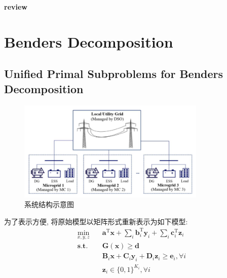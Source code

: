 \documentclass{article}
\begin{document}
\begin{center}
    \huge\bf review
\end{center}

\section{Benders Decomposition}
\subsection{Unified Primal Subproblems for Benders Decomposition}
\begin{figure}[htbp]
    \centering
    \includegraphics[width=0.8\textwidth]{./pic/NetworkedStructure.png}
    \caption{系统结构示意图}
    \label{fig:structure}
\end{figure}

为了表示方便, 将原始模型以矩阵形式重新表示为如下模型:
\begin{subequations}
    \begin{align}
        \min_{x, y, z}\quad &\mathbf{a}^\mathrm{T}\mathbf{x}+\sum_i\mathbf{b}_i^\mathrm{T}\mathbf{y}_i+\sum_i\mathbf{c}_i^\mathrm{T}\mathbf{z}_i \label{primal_a}\\
        \mathbf{s.t.}\quad & \mathbf{G}(\mathbf{x})\geq\mathbf{d} \label{primal_b} \\
        &\mathbf{B}_{i}\mathbf{x}+\mathbf{C}_{i}\mathbf{y}_{i}+\mathbf{D}_{i}\mathbf{z}_{i}\geq\mathbf{e}_{i}, \forall i \label{primal_c} \\
        &\mathbf{z}_{i}\in\{0, 1\}^{K_{i}}, \forall i \label{primal_d}
    \end{align}
\end{subequations}
\end{document}
